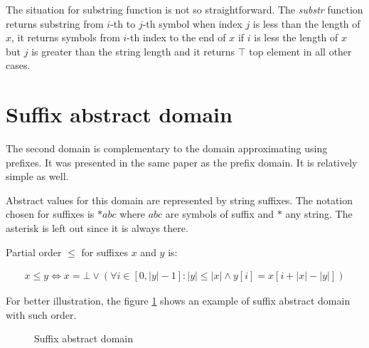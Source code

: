 \documentclass[12pt,final,oneside]{fithesis2}
\theoremstyle{definition}
\begin{document}
The situation for substring function is not so straightforward.
The \textit{substr} function returns substring from $i$-th to $j$-th symbol
when index $j$ is less than the length of $x$, it returns symbols from
$i$-th index to the end of $x$ if $i$ is less the length of $x$ but $j$
is greater than the string length and it returns $\top$ top element in
all other cases.


\section{Suffix abstract domain}

The second domain is complementary to the domain approximating using
prefixes. It was presented in the same paper \cite{Constantini11-1} as the
prefix domain. It is relatively simple as well.

Abstract values for this domain are represented by string suffixes.
The notation chosen for suffixes is $*abc$ where $abc$ are symbols of
suffix and $*$ any string. The asterisk is left out since it is always
there.

Partial order $\leq$ for suffixes $x$ and $y$ is:

\begin{align*}
x \leq y \Leftrightarrow
  x = \bot \lor (\forall i \in [0, |y| - 1] : |y| \leq |x| \land
    y[i] = x[i + |x| - |y|])
\end{align*}

For better illustration, the figure \ref{fig:suffixlattice} shows an
example of suffix abstract domain with such order.

\begin{figure}[h]
\centering
{}
\caption{Suffix abstract domain}
\label{fig:suffixlattice}
\end{figure}
\end{document}
